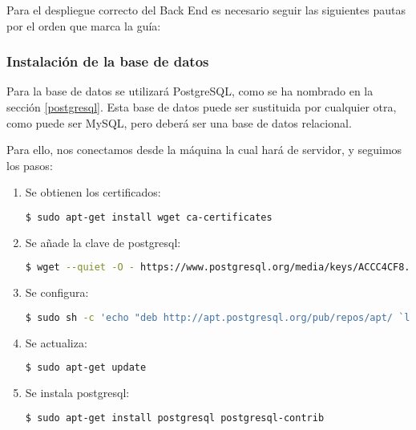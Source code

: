 Para el despliegue correcto del Back End es necesario seguir las siguientes pautas por el orden que marca la guía:

\subsubsection{Instalación de la base de datos}
    Para la base de datos se utilizará PostgreSQL, como se ha nombrado en la sección \ref{postgresql}.
    Esta base de datos puede ser sustituida por cualquier otra, como puede ser MySQL, pero deberá ser una base de datos relacional.
    
    Para ello, nos conectamos desde la máquina la cual hará de servidor, y seguimos los pasos:
    \begin{enumerate}
        \item Se obtienen los certificados:
            \begin{lstlisting}[language=bash]
        $ sudo apt-get install wget ca-certificates
            \end{lstlisting}
        
        \item Se añade la clave de postgresql:
            \begin{lstlisting}[language=bash]
        $ wget --quiet -O - https://www.postgresql.org/media/keys/ACCC4CF8.asc | sudo apt-key add -
            \end{lstlisting}
        
        \item Se configura:
            \begin{lstlisting}[language=bash]
        $ sudo sh -c 'echo "deb http://apt.postgresql.org/pub/repos/apt/ `lsb_release -cs`-pgdg main" >> /etc/apt/sources.list.d/pgdg.list'
            \end{lstlisting}
            
        \item Se actualiza:
            \begin{lstlisting}[language=bash]
        $ sudo apt-get update
            \end{lstlisting}
            
        \item Se instala postgresql:
            \begin{lstlisting}[language=bash]
        $ sudo apt-get install postgresql postgresql-contrib
            \end{lstlisting}
            

\end{enumerate}

